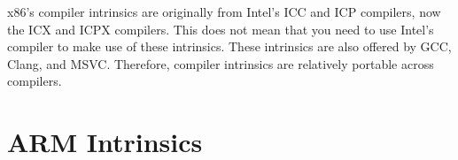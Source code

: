 x86's compiler intrinsics are originally from Intel's ICC and ICP compilers, now
the ICX and ICPX compilers. This does not mean that you need to use Intel's
compiler to make use of these intrinsics. These intrinsics are also offered by
GCC, Clang, and MSVC. Therefore, compiler intrinsics are relatively portable
across compilers.



\section{ARM Intrinsics}
